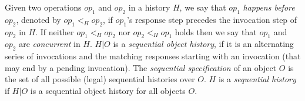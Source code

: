 

Given two operations $op_1$ and $op_2$ in a history $H$, we say that $op_1$ \textit{happens before} $op_2$, denoted by $op_1 <_H op_2$, if $op_1$'s response step precedes the invocation step of $op_2$ in $H$. If neither $op_1 <_H op_2$ nor $op_2 <_H op_1$ holds then we say that $op_1$ and $op_2$ are \textit{concurrent} in $H$.
$H | O$ is a \emph{sequential object history}, if it is an alternating series of invocations and the matching responses starting with an invocation (that may end by a pending invocation). The \textit{sequential specification} of an object $O$ is the set of all possible (legal) sequential histories over $O$. $H$ is a \emph{sequential history} if $H | O$ is a sequential object history for all objects $O$.


